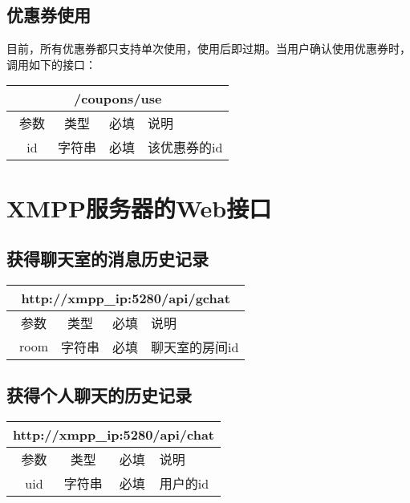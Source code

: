 \documentclass[cs4size]{ctexartutf8}
\begin{document}
\subsection{优惠券使用}
目前，所有优惠券都只支持单次使用，使用后即过期。当用户确认使用优惠券时，调用如下的接口：
\begin{table}[H]
   \begin{center}
\begin{tabular}{|c|c|c|p{12cm}|}
\hline
\multicolumn{4}{|c|}{/coupons/use} \\
\hline\hline
 \  参数  & 类型 & 必填 &  说明  \\
\hline
 \  id  & 字符串 & 必填 &  该优惠券的id  \\
\hline
\end{tabular}
   \end{center}
\end{table}


\section{XMPP服务器的Web接口}




\subsection{获得聊天室的消息历史记录}

\begin{table}[H]
   \begin{center}
\begin{tabular}{|c|c|c|p{12cm}|}
\hline
\multicolumn{4}{|c|}{http://xmpp\_ip:5280/api/gchat} \\
\hline\hline
 \  参数  & 类型 & 必填 &  说明  \\
\hline
 \  room  & 字符串 & 必填 &  聊天室的房间id  \\
\hline
\end{tabular}
   \end{center}
\end{table}


\subsection{获得个人聊天的历史记录}

\begin{table}[H]
   \begin{center}
\begin{tabular}{|c|c|c|p{12cm}|}
\hline
\multicolumn{4}{|c|}{http://xmpp\_ip:5280/api/chat} \\
\hline\hline
 \  参数  & 类型 & 必填 &  说明  \\
\hline
 \  uid  & 字符串 & 必填 &  用户的id  \\
\hline
\end{tabular}
   \end{center}
\end{table}
\end{document}
